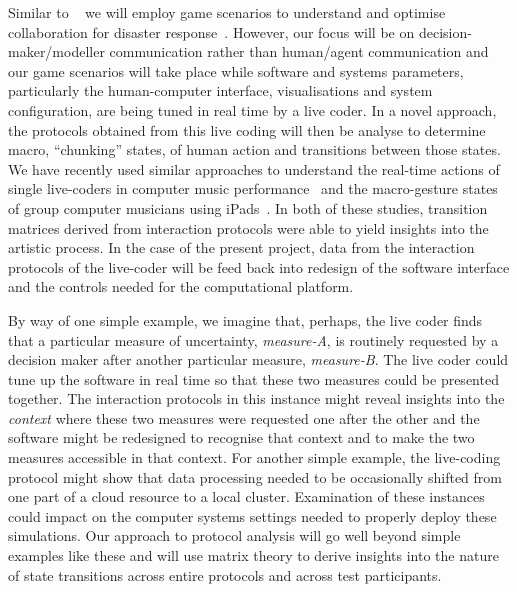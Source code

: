 \documentclass[a4paper,fontsize=12pt]{scrartcl}
\begin{document}

Similar to ~\parencite{ramchurn2016human} we will employ game
scenarios to understand and optimise collaboration for disaster
response~\parencite{ramchurn2016human}. However, our focus will be on
decision-maker/modeller communication rather than human/agent
communication and our game scenarios will take place while software
and systems parameters, particularly the human-computer interface,
visualisations and system configuration, are being tuned in real time
by a live coder. In a novel approach, the protocols obtained from this
live coding will then be analyse to determine macro, ``chunking''
states, of human action and transitions between those states. We have
recently used similar approaches to understand the real-time actions
of single live-coders in computer music
performance~\parencite{swift2014coding} and the macro-gesture states
of group computer musicians using
iPads~\parencite{martin2015tracking}. In both of these studies,
transition matrices derived from interaction protocols were able to
yield insights into the artistic process. In the case of the present
project, data from the interaction protocols of the live-coder will be
feed back into redesign of the software interface and the controls
needed for the computational platform.

By way of one simple example, we imagine that, perhaps, the live coder
finds that a particular measure of uncertainty, \emph{measure-A}, is
routinely requested by a decision maker after another particular
measure, \emph{measure-B}. The live coder could tune up the software
in real time so that these two measures could be presented together.
The interaction protocols in this instance might reveal insights into
the \emph{context} where these two measures were requested one after
the other and the software might be redesigned to recognise that
context and to make the two measures accessible in that context. For
another simple example, the live-coding protocol might show that data
processing needed to be occasionally shifted from one part of a cloud
resource to a local cluster. Examination of these instances could
impact on the computer systems settings needed to properly deploy
these simulations. Our approach to protocol analysis will go well
beyond simple examples like these and will use matrix theory to derive
insights into the nature of state transitions across entire protocols
and across test participants.
\end{document}
